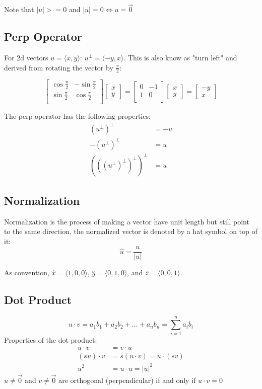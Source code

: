 \documentclass[12pt]{report}
\begin{document}
Note that $|u| >= 0$ and $|u| = 0 \Leftrightarrow u = \vec{0}$
	
\subsection{Perp Operator}
For 2d vectors $u = \langle x, y \rangle$:
$u^\perp = \langle -y, x \rangle$. This is also know as "turn left" and derived from rotating the vector by $\frac{\pi}{2}$:
	
$$
\begin{bmatrix}
	\cos\frac{\pi}{2} & -\sin\frac{\pi}{2} \\
	\sin\frac{\pi}{2} & \cos\frac{\pi}{2}  \\
\end{bmatrix}\begin{bmatrix}
x\\
y
\end{bmatrix} = 
\begin{bmatrix}
	0 & -1 \\
	1 & 0  \\
\end{bmatrix}\begin{bmatrix}
x\\
y
\end{bmatrix} =
\begin{bmatrix}
	-y \\
	x  
\end{bmatrix}
$$
	
	The perp operator has the following properties:
	\begin{align*}
	(u^\perp)^\perp &= -u \\
		-(u^\perp)^\perp &= u\\
	(((u^\perp)^\perp)^\perp)^\perp &= u
	\end{align*}
\subsection{Normalization}
Normalization is the process of making a vector have unit length but still point to the same direction, the normalized vector is denoted by a hat symbol on top of it:
$$
\hat{u} = \frac{u}{|u|}
$$
	
As convention, $\hat{x} = \langle 1, 0, 0 \rangle$, $\hat{y} = \langle 0, 1, 0 \rangle$, and $\hat{z} = \langle 0, 0, 1 \rangle$.
	
\subsection{Dot Product}
$$
u \cdot v = a_1b_1 + a_2b_2 + \dots + a_nb_n = \sum_{i=1}^{n}a_ib_i
$$
Properties of the dot product:
\begin{align*}
	u \cdot v    & = v \cdot u                  \\
	(su) \cdot v & = s(u \cdot v) = u\cdot (sv) \\
	u^2          & = u \cdot u = |u|^2          
\end{align*}
$u \neq \vec{0}$ and $v \neq \vec{0} $ are orthogonal (perpendicular) if and only if $u \cdot v = 0$
	
\end{document}
